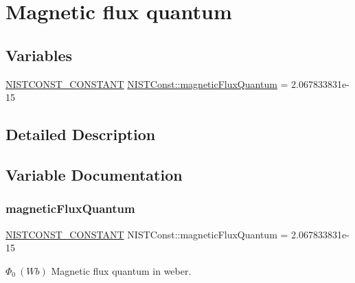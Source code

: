 \hypertarget{group___n_i_s_t_const-_magnetic_flux_quantum}{}\section{Magnetic flux quantum}
\label{group___n_i_s_t_const-_magnetic_flux_quantum}
\subsection*{Variables}
\begin{DoxyCompactItemize}
\item 
\mbox{\hyperlink{group___n_i_s_t_const-_macros_ga2b0fc1d7452373f816175dd86ce26729}{N\+I\+S\+T\+C\+O\+N\+S\+T\+\_\+\+C\+O\+N\+S\+T\+A\+NT}} \mbox{\hyperlink{group___n_i_s_t_const-_magnetic_flux_quantum_gade84700a3e9c0f4759560353e2da4dde}{N\+I\+S\+T\+Const\+::magnetic\+Flux\+Quantum}} = 2.\+067833831e-\/15
\end{DoxyCompactItemize}


\subsection{Detailed Description}


\subsection{Variable Documentation}
\mbox{\label{group___n_i_s_t_const-_magnetic_flux_quantum_gade84700a3e9c0f4759560353e2da4dde}} 
\subsubsection{\texorpdfstring{magnetic\+Flux\+Quantum}{magneticFluxQuantum}}
{\footnotesize\ttfamily \mbox{\hyperlink{group___n_i_s_t_const-_macros_ga2b0fc1d7452373f816175dd86ce26729}{N\+I\+S\+T\+C\+O\+N\+S\+T\+\_\+\+C\+O\+N\+S\+T\+A\+NT}} N\+I\+S\+T\+Const\+::magnetic\+Flux\+Quantum = 2.\+067833831e-\/15}

$\Phi_0 \ (Wb)$ Magnetic flux quantum in weber. 